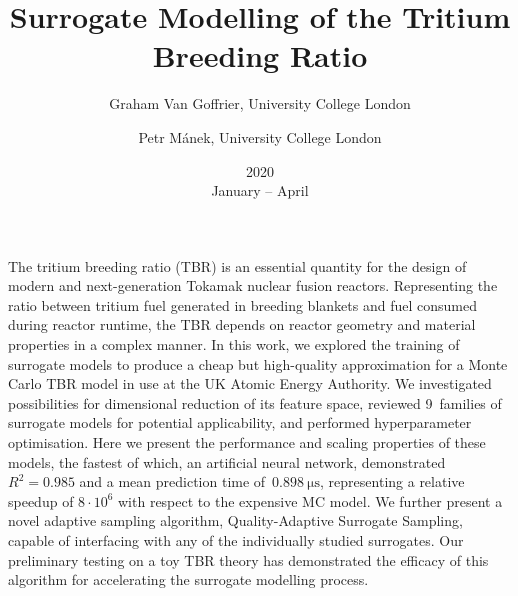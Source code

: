 \documentclass{article}
\title{Surrogate Modelling of the Tritium Breeding Ratio}
\date{2020\\ January -- April}
\author{
	Graham Van Goffrier, University College London\\
	\and Petr Mánek, University College London
}
\begin{document}
\maketitle

The tritium breeding ratio (TBR) is an essential quantity for the design of
modern and next-generation Tokamak nuclear fusion reactors. Representing the
ratio between tritium fuel generated in breeding blankets and fuel consumed
during reactor runtime, the TBR depends on reactor geometry and material
properties in a complex manner. In this work, we explored the
training of surrogate models to produce a cheap but high-quality approximation
for a Monte Carlo TBR model in use at the UK Atomic Energy Authority. We
investigated possibilities for dimensional reduction of its feature space, reviewed
9~families of surrogate models for potential
applicability, and performed hyperparameter optimisation. Here we present the
performance and scaling properties of these
models, the fastest of which, an artificial neural network,
demonstrated~$R^2=\num{0.985}$ and a mean
prediction time of~$\SI{0.898}{\micro\second}$, representing a relative speedup of $8\cdot 10^6$
with respect to the expensive MC model. We further present a novel adaptive
sampling algorithm, Quality-Adaptive Surrogate Sampling, capable
of interfacing with any of the individually studied surrogates. Our preliminary
testing on a toy TBR theory has demonstrated the efficacy of this algorithm for
accelerating the surrogate modelling process.
\end{document}
